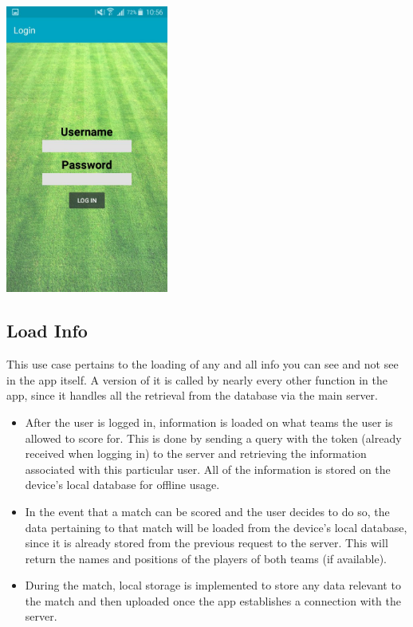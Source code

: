 \documentclass[hidelinks,a4paper,12pt]{article}
\begin{document}
  		\begin{center}
    			\includegraphics[width=0.4\textwidth]{./images/login_menu.jpg}
  		\end{center}

\newpage		

	\subsection{Load Info}
		This use case pertains to the loading of any and all info you can see and not see in the app itself. A version of it is called by nearly every other function in the app, since it handles all the retrieval from the database via the main server.
		\begin{itemize}
			\item After the user is logged in, information is loaded on what teams the user is allowed to score for. This is done by sending a query with the token (already received when logging in) to the server and retrieving the information associated with this particular user. All of the information is stored on the device's local database for offline usage.
			\item In the event that a match can be scored and the user decides to do so, the data pertaining to that match will be loaded from the device's local database, since it is already stored from the previous request to the server. This will return the names and positions of the players of both teams (if available).
			\item During the match, local storage is implemented to store any data relevant to the match and then uploaded once the app establishes a connection with the server.
		\end{itemize}
\end{document}
